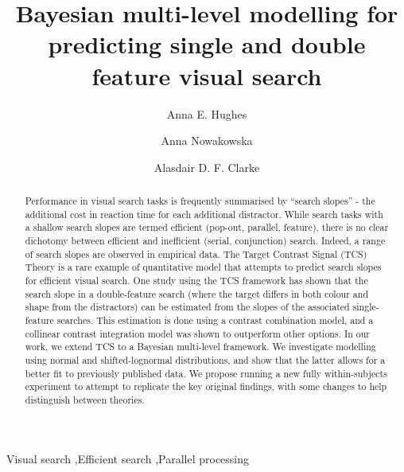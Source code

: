 \documentclass[preprint,12pt,authoryear]{elsarticle}
\begin{document}
\begin{frontmatter}


\title{Bayesian multi-level modelling for predicting single and double feature visual search}

\author[inst1]{Anna E. Hughes}
\author[2]{Anna Nowakowska}
\author[1]{Alasdair D. F. Clarke}

\address[inst1]{Department of Psychology,%
            University of Essex, 
            Colchester,
            CO4 3SQ,
            UK}

\address[2]{School of Psychology,%
            University of Aberdeen, 
            Aberdeen,
            AB24 3FX,            
            UK}

\begin{abstract}
Performance in visual search tasks is frequently summarised by ``search slopes'' - the additional cost in reaction time for each additional distractor. While search tasks with a shallow search slopes are termed efficient (pop-out, parallel, feature), there is no clear dichotomy between efficient and inefficient (serial, conjunction) search. Indeed, a range of search slopes are observed in empirical data. The Target Contrast Signal (TCS) Theory is a rare example of quantitative model that attempts to predict search slopes for efficient visual search. One study using the TCS framework has shown that the search slope in a double-feature search (where the target differs in both colour and shape from the distractors) can be estimated from the slopes of the associated single-feature searches. This estimation is done using a contrast combination model, and a collinear contrast integration model was shown to outperform other options. In our work, we extend TCS to a Bayesian multi-level framework. We investigate modelling using normal and shifted-lognormal distributions, and show that the latter allows for a better fit to previously published data. We propose running a new fully within-subjects experiment to attempt to replicate the key original findings, with some changes to help distinguish between theories. 
\end{abstract}


\begin{keyword}
Visual search \sep  Efficient search \sep Parallel processing
\end{keyword}

\end{frontmatter}

\linenumbers
\end{document}
